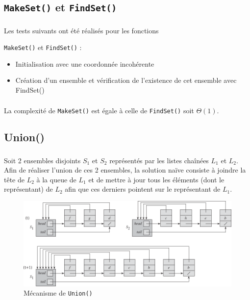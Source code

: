 \documentclass[10pt,a4paper]{article}
\begin{document}
\clearpage
\subsection{\texttt{MakeSet()} et \texttt{FindSet()}}

\subsubsection{}
Les tests suivants ont été réalisés pour les fonctions {\texttt{MakeSet()} et \texttt{FindSet()} :
\begin{itemize}
\item Initialisation avec une coordonnée incohérente
\item Création d'un ensemble et vérification de l'existence de cet ensemble avec FindSet()
\end{itemize}

\subsubsection{} \label{2.2}
La complexité de \texttt{MakeSet()} est égale à celle de \texttt{FindSet()} soit $\Theta(1)$.

\subsection{Union()}
\subsubsection{} \label{3.1}
Soit 2 ensembles disjoints $S_{1}$ et $S_{2}$ représentés par les listes chaînées $L_{1}$ et $L_{2}$. Afin de réaliser l'union de ces 2 ensembles, la solution naïve consiste à joindre la tête de $L_{2}$ à la queue de $L_{1}$ et de mettre à jour tous les éléments (dont le représentant) de $L_{2}$ afin que ces derniers pointent sur le représentant de $L_{1}$.

\begin{figure}[h]
\centering
\includegraphics{3-1.pdf}
\caption{Mécanisme de \texttt{Union()}}
\end{figure}

}
\end{document}
